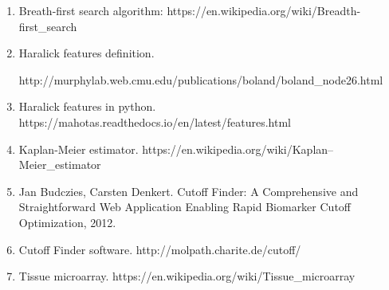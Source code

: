 \documentclass{article}
\begin{document}
\begin{enumerate}
\item Breath-first search algorithm: https://en.wikipedia.org/wiki/Breadth-first\_search

\item Haralick features definition.
      
      http://murphylab.web.cmu.edu/publications/boland/boland\_node26.html

\item Haralick features in python. https://mahotas.readthedocs.io/en/latest/features.html

\item Kaplan-Meier estimator. https://en.wikipedia.org/wiki/Kaplan--Meier\_estimator

\item Jan Budczies, Carsten Denkert. Cutoff Finder: A Comprehensive and Straightforward Web Application Enabling Rapid Biomarker Cutoff Optimization, 2012.

\item Cutoff Finder software. http://molpath.charite.de/cutoff/

\item Tissue microarray. https://en.wikipedia.org/wiki/Tissue\_microarray

\end{enumerate}
\end{document}
